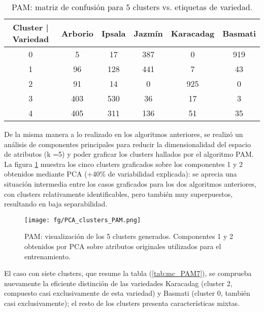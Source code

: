 \documentclass{article}
\begin{document}
\begin{table}[!htb]
    \centering
    \begin{tabular}{cccccc}
    \toprule
    Cluster | Variedad &  Arborio &  Ipsala &  Jazmín &  Karacadag & Basmati\\
    \midrule
    0 & 5 & 17 & 387 & 0 & 919 \\
    1 & 96 & 128 & 441 & 7 & 43 \\
    2 & 91 & 14 & 0 & 925 & 0 \\
    3 & 403 & 530 & 36 & 17 & 3 \\
    4 & 405 & 311 & 136 & 51 & 35 \\
    \bottomrule
    \end{tabular}
    \caption{PAM: matriz de confusión para 5 clusters vs. etiquetas de variedad.}
    \label{tab:mc_PAM5}
\end{table}

De la misma manera a lo realizado en los algoritmos anteriores, se realizó un análisis de componentes principales para reducir la dimensionalidad del espacio de atributos (k =5) y poder graficar los clusters hallados por el algoritmo PAM.
La figura \ref{fg_PCA_clusters_PAM} muestra los cinco clusters graficados sobre los componentes 1 y 2 obtenidos mediante PCA (+40\% de variabilidad explicada): se aprecia una situación intermedia entre los casos graficados para los dos algoritmos anteriores, con clusters relativamente identificables, pero también muy superpuestos, resultando en baja separabilidad.

\begin{figure} [!htb]
	\centering
	\texttt{[image: fg/PCA\_clusters\_PAM.png]}
	\caption{PAM: visualización de los 5 clusters generados. Componentes 1 y 2 obtenidos por PCA sobre atributos originales utilizados para el entrenamiento.}	
    \label{fg_PCA_clusters_PAM}
\end{figure}

El caso con siete clusters, que resume la tabla (\ref{tab:mc_PAM7}), se comprueba nuevamente la eficiente distinción de las variedades Karacadag (cluster 2, compuesto casi exclusivamente de esta variedad) y Basmati (cluster 0, también casi exclusivamente); el resto de los clusters presenta características mixtas.
\end{document}
